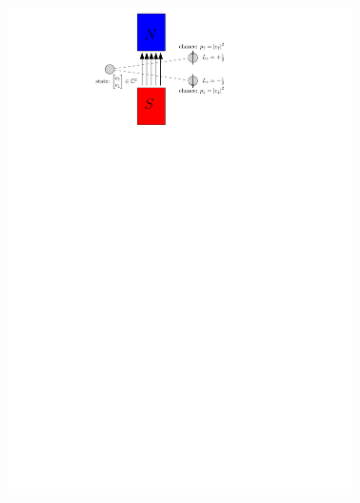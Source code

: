 \documentclass[final,3p,mathptmx]{elsarticle}
\begin{document}
\begin{figure}[h]
	\begin{subfigure}{0.48\textwidth}
		\centering
		\includegraphics[width=\textwidth, keepaspectratio]{figures/spin_anim_06.pdf}
		\label{fig:spin12}
	\end{subfigure}
	\begin{subfigure}{0.48\textwidth}
		\centering

\end{subfigure}
\end{figure}
\end{document}
